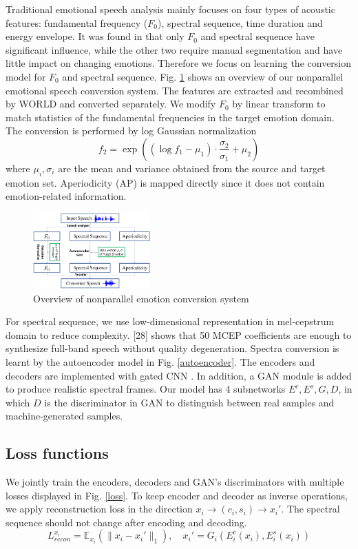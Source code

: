 \documentclass{article}
\begin{document}
Traditional emotional speech analysis mainly focuses on four types of acoustic features: fundamental frequency ($F_0$), spectral sequence, time duration and energy envelope. It was found in \cite{xue2018voice} that only $F_0$ and spectral sequence have significant influence, while the other two require manual segmentation and have little impact on changing emotions. Therefore we focus on learning the conversion model for $F_0$ and spectral sequence. Fig. \ref{model} shows an overview of our nonparallel emotional speech conversion system. The features are extracted and recombined by WORLD \cite{morise2016world} and converted separately. We modify $F_0$ by linear transform to match statistics of the fundamental frequencies in the target emotion domain. The conversion is performed by log Gaussian normalization
\begin{equation}
f_2 = \exp((\log f_1 - \mu_1)\cdot\frac{\sigma_2}{\sigma_1} + \mu_2)
\label{eq:f0}
\end{equation}
where $\mu_i, \sigma_i$ are the mean and variance obtained from the source and target emotion set. Aperiodicity (AP) is mapped directly since it does not contain emotion-related information.

\begin{figure}[htb]
\center
\includegraphics[width=0.4\textwidth]{FIG/model}
\caption{Overview of nonparallel emotion conversion system}
\label{model}
\end{figure}

For spectral sequence, we use low-dimensional representation in mel-cepstrum domain to reduce complexity. [28] shows that 50 MCEP coefficients are enough to synthesize full-band speech without quality degeneration. Spectra conversion is learnt by the autoencoder model in Fig. \ref{autoencoder}. The encoders and decoders are implemented with gated CNN \cite{dauphin2017language}. In addition, a GAN module is added to produce realistic spectral frames. Our model has 4 subnetworks $E^c, E^s, G, D$, in which $D$ is the discriminator in GAN to distinguish between real samples and machine-generated samples.


\subsection{Loss functions}
We jointly train the encoders, decoders and GAN's discriminators with multiple losses displayed in Fig. \ref{loss}. To keep encoder and decoder as inverse operations, we apply reconstruction loss in the direction $x_i \rightarrow (c_i, s_i) \rightarrow x_i'$. The spectral sequence should not change after encoding and decoding.
\begin{equation}
L_{recon}^{x_i} = \mathbb{E}_{x_i}(\| x_i - x_i' \|_1), \quad x_i' = G_i(E_i^c(x_i), E_i^s(x_i))
\end{equation}
\end{document}
